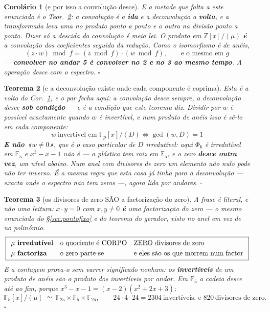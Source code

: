 \documentclass[11pt,a4paper]{article}
\newtheorem{teorema}{Teorema}
\newtheorem{corolario}[teorema]{Corolário}
\begin{document}
\begin{corolario}[e por isso a convolução desce]\label{cor:conv-desce}
\emph{E a metade que falta a este enunciado é o Teor.~\ref{thm:decon-andar}}: a convolução
é a \textbf{ida} e a deconvolução a \textbf{volta}, e a transformada leva uma no produto
ponto a ponto e a outra na divisão ponto a ponto. Dizer só a descida da convolução é meia
lei.
O produto em $\mathbb{Z}[x]/(\mu)$ \textbf{é} a convolução dos coeficientes seguida
da redução. Como o isomorfismo é de \emph{anéis},
\[
\boxed{\;(z\cdot w)\bmod f=(z\bmod f)\cdot(w\bmod f),
\qquad\text{e o mesmo em } g\;}
\]
--- \textbf{convolver no andar 5 é convolver no 2 e no 3 ao mesmo tempo}. A operação
desce com o espectro. $\square$
\end{corolario}

\begin{teorema}[e a deconvolução existe onde cada componente é coprima]\label{thm:decon-andar}
\emph{Esta é a volta do Cor.~\ref{cor:conv-desce}}, e o par fecha aqui: a convolução desce
sempre, a deconvolução desce \textbf{sob condição} --- e é a condição que este teorema diz.
Dividir por $w$ é possível exactamente quando $w$ é invertível, e num produto de
anéis isso é sê-lo em \emph{cada} componente:
\[
\boxed{\;w\ \text{invertível em } \mathbb{F}_p[x]/(D)
\iff \gcd(w,D)=1\;}
\]
\textbf{E não «$w\neq0$»}, que é o caso particular de $D$ irredutível: aqui $\Phi_6$
é irredutível em $\mathbb{F}_5$ e $x^{3}-x-1$ \emph{não} é --- a plástica tem raiz em
$\mathbb{F}_5$, e o zero \textbf{desce outra vez}, um nível abaixo. Num anel com
divisores de zero um elemento não nulo pode não ter inverso. \emph{É a mesma regra
que esta casa já tinha para a deconvolução --- exacta onde o espectro não tem zeros
---, agora lida por andares.} $\square$
\end{teorema}
\begin{teorema}[os divisores de zero SÃO a factorização do zero]\label{thm:divzero}
A frase é literal, e não uma leitura: $x\cdot y=0$ com $x,y\neq0$ \textbf{é} uma
factorização do zero --- o mesmo enunciado do \S\ref{sec:pontofixo} e do teorema do
gerador, visto no \emph{anel} em vez de no polinómio.
\[
\boxed{
\begin{array}{lll}
\mu\ \text{\textbf{irredutível}} & \text{o quociente é CORPO} & \text{ZERO divisores de zero}\\[3pt]
\mu\ \text{\textbf{factoriza}} & \text{o zero parte-se} & \text{e eles são os que morrem
num factor}
\end{array}}
\]
E a contagem prova-o sem varrer significado nenhum: os \textbf{invertíveis} de um
produto de anéis são o \emph{produto} dos invertíveis por andar. Em $\mathbb{F}_5$ a
cadeia desce até ao fim, porque $x^{3}-x-1=(x-2)(x^{2}+2x+3)$:
\[
\mathbb{F}_5[x]/(\mu)\ \simeq\ \mathbb{F}_{25}\times\mathbb{F}_{5}\times\mathbb{F}_{25},
\qquad 24\cdot4\cdot24=2304\ \text{invertíveis, e } 820\ \text{divisores de zero.}
\]
$\square$
\end{teorema}
\end{document}
